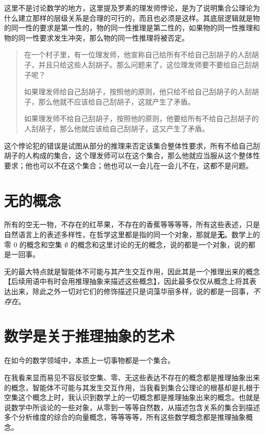 \documentclass[12pt,oneside]{book}
\begin{document}
这里不是讨论数学的地方，这里提及罗素的理发师悖论，是为了说明集合公理论为什么建立那样的层级关系是合理的可行的，而且也必须是这样。其底层逻辑就是物的同一性的要求是第一性的，物的同一性推理是第二性的，如果物的同一性推理和物的同一性要求发生冲突，那么物的同一性推理将被否定。

\begin{quote}
在一个村子里，有一位理发师，他宣称自己给所有不给自己刮胡子的人刮胡子，并且只给这些人刮胡子。那么问题来了，这位理发师要不要给自己刮胡子呢？

如果理发师给自己刮胡子，按照他的原则，他只给不给自己刮胡子的人刮胡子，那么他就不应该给自己刮胡子，这就产生了矛盾。

如果理发师不给自己刮胡子，按照他的原则，他要给所有不给自己刮胡子的人刮胡子，那么他就应该给自己刮胡子，这又产生了矛盾。
\end{quote}

这个悖论犯的错误是试图从部分的推理来否定该集合整体性要求，所有不给自己刮胡子的人构成的集合，这个理发师可以在这个集合，那么他就应当服从这个整体性要求；他也可以不在这个集合；他也可以一会儿在一会儿不在，这都不是问题。

\section{无的概念}
所有的空无一物，不存在的红苹果，不存在的香蕉等等等等，所有这些表述，只是自然语言上的表述多样性，在哲学这里都是指的同一个对象，那就是\textbf{无}。数学上的零 $0$ 的概念和空集 $\emptyset$ 的概念和这里讨论的无的概念，说的都是一个对象，说的都是一回事。

无的最大特点就是智能体不可能与其产生交互作用，因此其是一个推理出来的概念【后续用语中有时会用推理抽象来描述这些概念】，因此最多仅仅从概念上将其表达出来，除此之外一切对它们的修饰描述只是词藻华丽多样，说的都是一回事，\textit{不存在}。

\section{数学是关于推理抽象的艺术}
\begin{bookref}[frametitle={\cite{Elements of Set Theory}}]
在如今的数学领域中，本质上一切事物都是一个集合。
\end{bookref}

在我看来显而易见不容反驳空集、零、无这些表达不存在的概念都是推理抽象出来的概念，智能体不可能与其发生交互作用，当我看到集合公理论的根基却是扎根于空集这个概念上时，我认识到数学上的一切概念都是推理抽象出来的概念。也就是说数学中所谈论的一些对象，从零到一等等自然数，从描述包含关系的集合到描述多个分析维度的综合的向量概念，等等等等，所有这些数学概念都是推理抽象概念。
\end{document}
